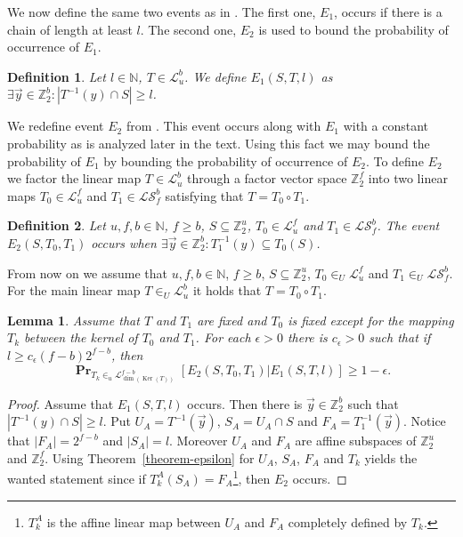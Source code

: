\documentclass{article}
\newcommand{\vecspace}[2]{\mathbb{Z}_{#1}^{#2}}
\newcommand{\binvecspace}[1]{\vecspace{2}{#1}}
\newcommand{\linearmaps}[2]{\mathcal{L}_{#1}^{#2}}
\newcommand{\surjectivelinearmaps}[2]{\mathcal{LS}_{#1}^{#2}}
\newcommand{\probs}[2]{\operatorname{\mathbf{Pr}}_{{#1}}\left[{#2}\right]}
\newtheorem{lemma}{Lemma}
\newtheorem{definition}{Definition}
\begin{document}
We now define the same two events as in \cite{alonetal}.
The first one, $E_1$, occurs if there is a chain of length at least $l$.
The second one, $E_2$ is used to bound the probability of occurrence of  $E_1$.
\begin{definition}
Let $l \in \mathbb{N}$, $T \in \linearmaps{u}{b}$. We define $E_1(S, T, l)$ as $\exists \vec{y} \in \binvecspace{b} \colon |T^{-1}(y) \cap S| \geq l$.
\end{definition}

We redefine event $E_2$ from \cite{alonetal}. 
This event occurs along with $E_1$ with a constant probability as is analyzed later in the text. 
Using this fact we may bound the probability of $E_1$ by bounding the probability of occurrence of $E_2$. 
To define $E_2$ we factor the linear map $T \in \linearmaps{u}{b}$ through a factor vector space $\binvecspace{f}$ into two linear maps $T_0 \in \linearmaps{u}{f}$ and $T_1 \in \surjectivelinearmaps{f}{b}$ satisfying that $T = T_0 \circ T_1$.
\begin{definition}
Let $u, f, b \in \mathbb{N}$, $f \geq b$, $S \subseteq \binvecspace{u}$, $T_0 \in \linearmaps{u}{f}$ and $T_1 \in \surjectivelinearmaps{f}{b}$.
The event $E_2(S, T_0, T_1)$ occurs when $\exists \vec{y} \in \binvecspace{b} \colon T_1^{-1}(y) \subseteq T_0(S)$.
\end{definition}

From now on we assume that $u, f, b \in \mathbb{N}$, $f \geq b$, $S \subseteq \binvecspace{u}$, $T_0 \in_U \linearmaps{u}{f}$ and $T_1 \in_U \surjectivelinearmaps{f}{b}$. 
For the main linear map $T \in_U \linearmaps{u}{b}$ it holds that $T = T_0 \circ T_1$.

\begin{lemma}
\label{lemma-e1-e2}
Assume that $T$ and $T_1$ are fixed and $T_0$ is fixed except for the mapping $T_k$ between the kernel of $T_0$ and $T_1$.
For each $\epsilon > 0$ there is $c_\epsilon > 0$ such that if $l \geq c_\epsilon (f - b)2^{f-b}$, then
\[
\probs{T_k \in_u \linearmaps{\operatorname{dim}(\operatorname{Ker}(T))}{f-b}}{E_2(S, T_0, T_1) | E_1(S, T, l)} \geq 1 - \epsilon.
\]
\end{lemma}
\begin{proof}
Assume that $E_1(S, T, l)$ occurs. 
Then there is $\vec{y} \in \binvecspace{b}$ such that $|T^{-1}(y) \cap S| \geq l$.
Put $U_A = T^{-1}(\vec{y})$, $S_A = U_A \cap S$ and $F_A = T_1^{-1}(\vec{y})$.
Notice that $|F_A| = 2^{f-b}$ and $|S_A| = l$.
Moreover $U_A$ and $F_A$ are affine subspaces of $\binvecspace{u}$ and $\binvecspace{f}$.
Using Theorem~\ref{theorem-epsilon} for $U_A$, $S_A$, $F_A$ and $T_k$ yields the wanted statement since if $T_k^A(S_A) = F_A$\footnote{$T_k^A$ is the affine linear map between $U_A$ and $F_A$ completely defined by $T_k$.}, then $E_2$  occurs.
\end{proof}
\end{document}
